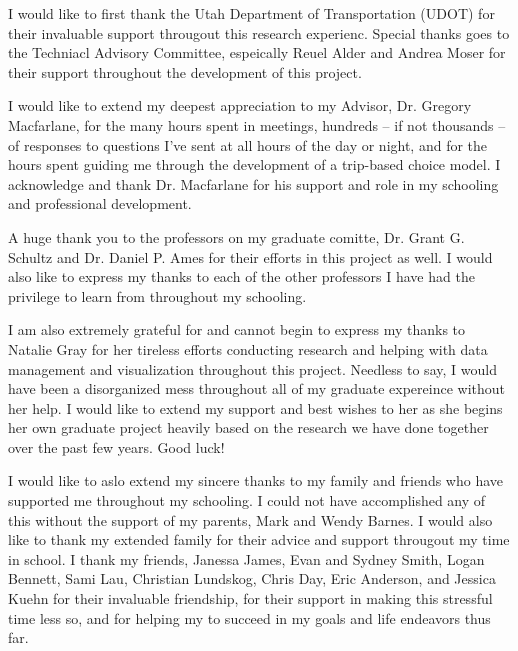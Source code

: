\afterpage{\cleardoublepage}
%
 I would like to first thank the Utah Department of Transportation (UDOT) for their invaluable support througout this research experienc. Special thanks goes to the Techniacl Advisory Committee, espeically Reuel Alder and Andrea Moser for their support throughout the development of this project.

 I would like to extend my deepest appreciation to my Advisor, Dr. Gregory Macfarlane, for the many hours spent in meetings, hundreds -- if not thousands -- of responses to questions I've sent at all hours of the day or night, and for the hours spent guiding me through the development of a trip-based choice model. I acknowledge and thank Dr. Macfarlane for his support and role in my schooling and professional development.

A huge thank you to the professors on my graduate comitte, Dr. Grant G. Schultz and Dr. Daniel P. Ames for their efforts in this project as well. I would also like to express my thanks to each of the other professors I have had the privilege to learn from throughout my schooling.

 I am also extremely grateful for and cannot begin to express my thanks to Natalie Gray for her tireless efforts conducting research and helping with data management and visualization throughout this project. Needless to say, I would have been a disorganized mess throughout all of my graduate expereince without her help. I would like to extend my support and best wishes to her as she begins her own graduate project heavily based on the research we have done together over the past few years. Good luck!

I would like to aslo extend my sincere thanks to my family and friends who have supported me throughout my schooling. I could not have accomplished any of this without the support of my parents, Mark and Wendy Barnes. I would also like to thank my extended family for their advice and support througout my time in school. I thank my friends, Janessa James, Evan and Sydney Smith, Logan Bennett, Sami Lau, Christian Lundskog, Chris Day, Eric Anderson, and Jessica Kuehn for their invaluable friendship, for their support in making this stressful time less so, and for helping my to succeed in my goals and life endeavors thus far.
